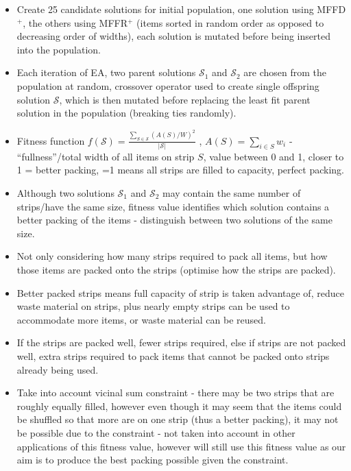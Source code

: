 \documentclass{elsarticle}
\begin{document}
\begin{itemize}
	\item Create 25 candidate solutions for initial population, one solution using MFFD$^+$, the others using MFFR$^+$ (items sorted in random order as opposed to decreasing order of widths), each solution is mutated before being inserted into the population.
	\item Each iteration of EA, two parent solutions $\mathcal{S}_1$ and $\mathcal{S}_2$ are chosen from the population at random, crossover operator used to create single offspring solution $\mathcal{S}$, which is then mutated before replacing the least fit parent solution in the population (breaking ties randomly).
	\item Fitness function $f(\mathcal{S}) = \frac{\sum_{S \in \mathcal{S}} (A(S)/W)^2}{|\mathcal{S}|}$ \cite{falkenauer1992}, $A(S) = \sum_{i \in S} w_i$ - ``fullness''/total width of all items on strip $S$, value between 0 and 1, closer to 1 = better packing, =1 means all strips are filled to capacity, perfect packing.
	\item Although two solutions $\mathcal{S}_1$ and $\mathcal{S}_2$ may contain the same number of strips/have the same size, fitness value identifies which solution contains a better packing of the items - distinguish between two solutions of the same size.
	\item Not only considering how many strips required to pack all items, but how those items are packed onto the strips (optimise how the strips are packed).
	\item Better packed strips means full capacity of strip is taken advantage of, reduce waste material on strips, plus nearly empty strips can be used to accommodate more items, or waste material can be reused.
	\item If the strips are packed well, fewer strips required, else if strips are not packed well, extra strips required to pack items that cannot be packed onto strips already being used.
	\item Take into account vicinal sum constraint - there may be two strips that are roughly equally filled, however even though it may seem that the items could be shuffled so that more are on one strip (thus a better packing), it may not be possible due to the constraint - not taken into account in other applications of this fitness value, however will still use this fitness value as our aim is to produce the best packing possible given the constraint.
\end{itemize}
\end{document}
